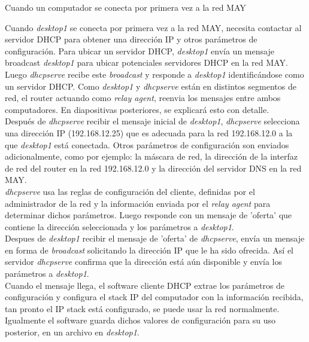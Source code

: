 \begin{frame}{Cuando un computador se conecta por primera vez a la red
MAY} %

    Cuando \textit{desktop1} se conecta por primera vez a la red MAY, necesita
    contactar al servidor DHCP para obtener una dirección IP y otros parámetros
    de configuración. Para ubicar un servidor DHCP, \textit{desktop1} envía un
    mensaje broadcast \textit{desktop1} para ubicar potenciales servidores
    DHCP en la red MAY.\\[0.2cm]

    Luego \textit{dhcpserve} recibe este \textit{broadcast} y responde a
    \textit{desktop1} identificándose como un servidor DHCP. Como
    \textit{desktop1} y \textit{dhcpserve} están en distintos segmentos de red,
    el router actuando como \textit{relay agent}, reenvia los mensajes entre
    ambos computadores. En diapositivas posteriores, se explicará esto con
    detalle.\\[0.2cm]

    Después de \textit{dhcpserve} recibir el mensaje inicial de
    \textit{desktop1}, \textit{dhcpserve} selecciona una dirección IP
    (192.168.12.25) que es adecuada para la red 192.168.12.0 a la que \textit{desktop1} está
    conectada. Otros parámetros de configuración son enviados adicionalmente, como por
    ejemplo: la máscara de red, la dirección de la interfaz de red del router
    en la red 192.168.12.0 y la dirección del servidor DNS en la red
    MAY.\\[0.2cm]

    \textit{dhcpserve} usa las reglas de configuración del cliente, definidas
    por el administrador de la red y la información enviada por el
    \textit{relay agent} para determinar dichos parámetros. Luego responde con
    un mensaje de 'oferta' que contiene la dirección seleccionada y los
    parámetros a \textit{desktop1}.\\[0.2cm]

    Despues de \textit{desktop1} recibir el mensaje de 'oferta' de
    \textit{dhcpserve}, envía un mensaje en forma de \textit{broadcast}
    solicitando la dirección IP que le ha sido ofrecida. Así el servidor
    \textit{dhcpserve} confirma que la dirección está aún disponible y envía
    los parámetros a \textit{desktop1}.\\[0.2cm]

    Cuando el mensaje llega, el software cliente DHCP extrae los parámetros de
    configuración y configura el stack IP del computador con la información
    recibida, tan pronto el IP stack está configurado, se puede usar la red
    normalmente. Igualmente el software guarda dichos valores de configuración
    para su uso posterior, en un archivo en \textit{desktop1}.\\[0,2cm]

\end{frame}


